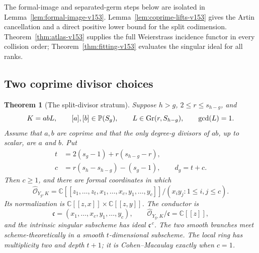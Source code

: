 \documentclass[11pt,reqno]{amsart}
\numberwithin{equation}{section}
\newtheorem{theorem}{Theorem}[section]
\theoremstyle{definition}\newtheorem{definition}[theorem]{Definition}
\theoremstyle{remark}\newtheorem{remark}[theorem]{Remark}
\newcommand{\C}{\mathbb C}\newcommand{\Q}{\mathbb Q}
\newcommand{\Pj}{\mathbb P}\newcommand{\A}{\mathbb A}
\newcommand{\OO}{\mathcal O}\newcommand{\II}{\mathcal I}
\begin{document}
The formal-image and separated-germ steps below are isolated in
Lemma~\ref{lem:formal-image-v153}. Lemma~\ref{lem:coprime-lifts-v153}
gives the Artin cancellation and a direct positive lower bound for the
split codimension. Theorem~\ref{thm:atlas-v153} supplies the full
Weierstrass incidence functor in every collision order;
Theorem~\ref{thm:fitting-v153} evaluates the singular ideal for all ranks.

\subsection{Two coprime divisor choices}
\begin{theorem}[The split-divisor stratum]\label{thm:split-conductor-v152}
Suppose $h>g$, $2\leq r\leq s_{h-g}$, and
\[
 K=abL,\qquad [a],[b]\in\Pj(S_g),\qquad
 L\in\Gr(r,S_{h-g}),\qquad \gcd(L)=1.
\]
Assume that $a,b$ are coprime and that the only degree-$g$ divisors of
$ab$, up to scalar, are $a$ and $b$.  Put
\begin{align*}
 t&=2(s_g-1)+r(s_{h-g}-r),\\
 c&=r(s_h-s_{h-g})-(s_g-1),\qquad d_g=t+c.
\end{align*}
Then $c\geq1$, and there are formal coordinates in which
\begin{equation}\label{eq:split-ring-v152}
 \widehat{\OO}_{Y_g,K}=
 \C[[z_1,\ldots,z_t,x_1,\ldots,x_c,y_1,\ldots,y_c]]/
                       (x_i y_j:1\leq i,j\leq c).
\end{equation}
Its normalization is
$\C[[z,x]]\times\C[[z,y]]$.  The conductor is
\begin{equation}\label{eq:split-conductor-v152}
 \mathfrak c=(x_1,\ldots,x_c,y_1,\ldots,y_c),\qquad
 \widehat{\OO}_{Y_g,K}/\mathfrak c=\C[[z]],
\end{equation}
and the intrinsic singular subscheme has ideal $\mathfrak c^{\,c}$.
The two smooth branches meet scheme-theoretically in a smooth
$t$-dimensional subscheme.  The local ring has multiplicity two and
depth $t+1$; it is Cohen--Macaulay exactly when $c=1$.
\end{theorem}
\end{document}
